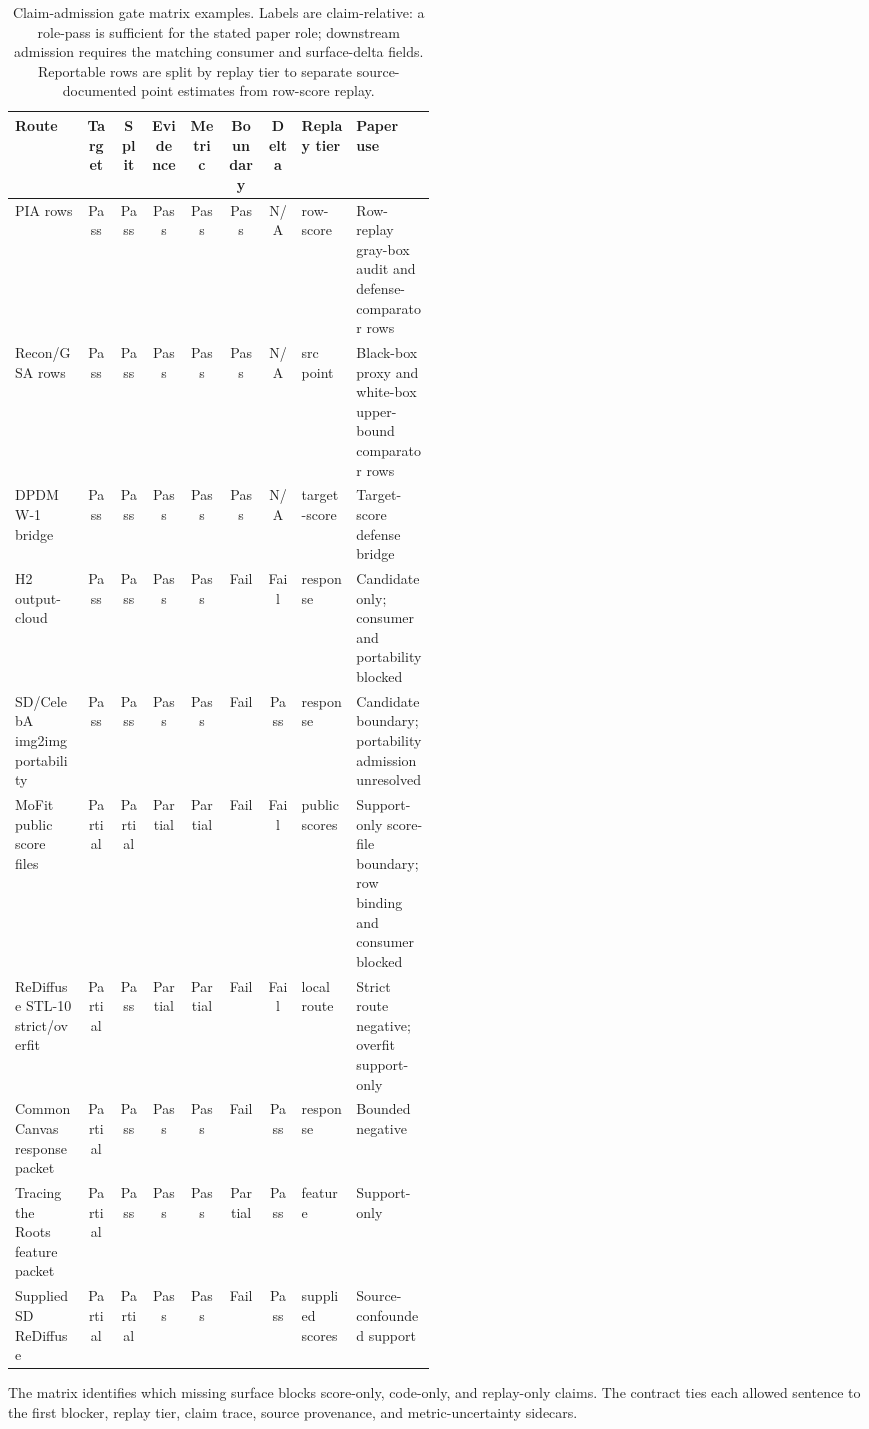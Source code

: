 \documentclass[10pt,conference]{IEEEtran}
\begin{document}
\begin{table}[t]
\centering
\caption{Claim-admission gate matrix examples. Labels are claim-relative: a
role-pass is sufficient for the stated paper role; downstream admission requires
the matching consumer and surface-delta fields. Reportable rows are split by replay tier to separate
source-documented point estimates from row-score replay.}
\label{tab:gate-matrix}
\scriptsize
\setlength{\tabcolsep}{3pt}
\begin{tabular}{@{}L{0.17\linewidth}ccccccL{0.13\linewidth}L{0.19\linewidth}@{}}
\toprule
Route & Target & Split & Evidence & Metric & Boundary & Delta & Replay tier & Paper use \\
\midrule
PIA rows & Pass & Pass & Pass & Pass & Pass & N/A & row-score & Row-replay gray-box audit and defense-comparator rows \\
Recon/GSA rows & Pass & Pass & Pass & Pass & Pass & N/A & src point & Black-box proxy and white-box upper-bound comparator rows \\
DPDM W-1 bridge & Pass & Pass & Pass & Pass & Pass & N/A & target-score & Target-score defense bridge \\
H2 output-cloud & Pass & Pass & Pass & Pass & Fail & Fail & response & Candidate only; consumer and portability blocked \\
SD/CelebA img2img portability & Pass & Pass & Pass & Pass & Fail & Pass & response & Candidate boundary; portability admission unresolved \\
MoFit public score files & Partial & Partial & Partial & Partial & Fail & Fail & public scores & Support-only score-file boundary; row binding and consumer blocked \\
ReDiffuse STL-10 strict/overfit & Partial & Pass & Partial & Partial & Fail & Fail & local route & Strict route negative; overfit support-only \\
CommonCanvas response packet & Partial & Pass & Pass & Pass & Fail & Pass & response & Bounded negative \\
Tracing the Roots feature packet & Partial & Pass & Pass & Pass & Partial & Pass & feature & Support-only \\
Supplied SD ReDiffuse & Partial & Partial & Pass & Pass & Fail & Pass & supplied scores & Source-confounded support \\
\bottomrule
\end{tabular}
\end{table}

The matrix identifies which missing surface blocks score-only, code-only, and
replay-only claims. The contract ties each allowed sentence to the first
blocker, replay tier, claim trace, source provenance, and metric-uncertainty
sidecars.
\end{document}

